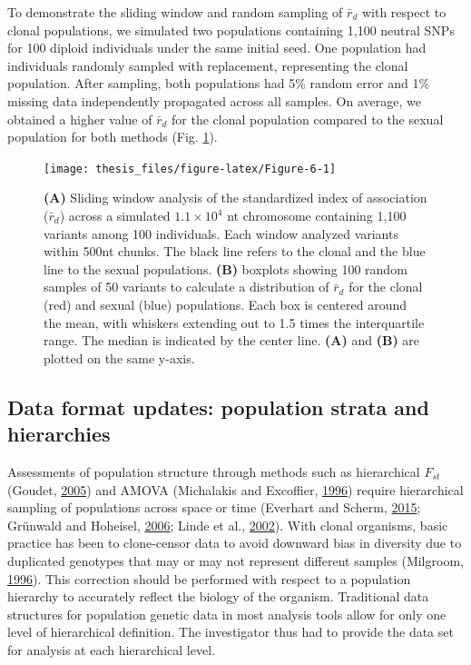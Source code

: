 \documentclass[double,12pt]{beavtex}
\begin{document}
  To demonstrate the sliding window and random sampling of \(\bar{r}_d\)
  with respect to clonal populations, we simulated two populations
  containing 1,100 neutral SNPs for 100 diploid individuals under the same
  initial seed. One population had individuals randomly sampled with
  replacement, representing the clonal population. After sampling, both
  populations had 5\% random error and 1\% missing data independently
  propagated across all samples. On average, we obtained a higher value of
  \(\bar{r}_d\) for the clonal population compared to the sexual
  population for both methods (Fig. \ref{fig:Figure-6}).
  
  \begin{figure}
  
  {\centering \texttt{[image: thesis\_files/figure-latex/Figure-6-1]} 
  
  }
  
  \caption[Sliding window analysis of the standardized index of association
  (\(\bar{r}_d\))]{\textbf{(A)} Sliding window analysis of the standardized index of
  association (\(\bar{r}_d\)) across a simulated \(1.1 \times 10^4\) nt
  chromosome containing 1,100 variants among 100 individuals. Each window
  analyzed variants within 500nt chunks. The black line refers to the
  clonal and the blue line to the sexual populations. \textbf{(B)}
  boxplots showing 100 random samples of 50 variants to calculate a
  distribution of \(\bar{r}_d\) for the clonal (red) and sexual (blue)
  populations. Each box is centered around the mean, with whiskers
  extending out to 1.5 times the interquartile range. The median is
  indicated by the center line. \textbf{(A)} and \textbf{(B)} are plotted
  on the same y-axis.}\label{fig:Figure-6}
  \end{figure}
  
  \subsection{Data format updates: population strata and
  hierarchies}\label{data-format-updates-population-strata-and-hierarchies}
  
  Assessments of population structure through methods such as hierarchical
  \(F_{st}\) (Goudet, \protect\hyperlink{ref-goudet2005hierfstat}{2005})
  and AMOVA (Michalakis and Excoffier,
  \protect\hyperlink{ref-michalakis1996generic}{1996}) require
  hierarchical sampling of populations across space or time (Everhart and
  Scherm, \protect\hyperlink{ref-everhart2014fine}{2015}; Grünwald and
  Hoheisel, \protect\hyperlink{ref-grunwald2006hierarchical}{2006}; Linde
  et al., \protect\hyperlink{ref-linde2002population}{2002}). With clonal
  organisms, basic practice has been to clone-censor data to avoid
  downward bias in diversity due to duplicated genotypes that may or may
  not represent different samples (Milgroom,
  \protect\hyperlink{ref-milgroom1996recombination}{1996}). This
  correction should be performed with respect to a population hierarchy to
  accurately reflect the biology of the organism. Traditional data
  structures for population genetic data in most analysis tools allow for
  only one level of hierarchical definition. The investigator thus had to
  provide the data set for analysis at each hierarchical level.
  
\end{document}
